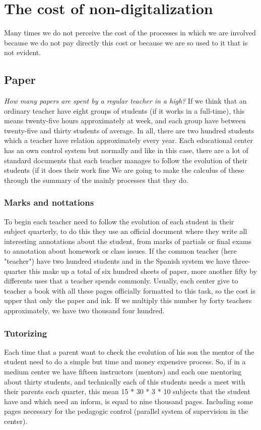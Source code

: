 \section{The cost of non-digitalization}

Many times we do not perceive the cost of the processes in which we are involved
because we do not pay directly this cost or because we are so used to it that is
not evident.

\subsection{Paper}
\textit{How many papers are spent by a regular teacher in a high?}
\intro
If we think that an ordinary teacher have eight groups of students (if it works in a
full-time), this means twenty-five hours approximately at week, and each group have
between twenty-five and thirty students of average. In all, there are two hundred students which a teacher have
relation approximately every year.
\intro
Each educational center has an own control system but normally and like in this case,
there are a lot of standard documents that each teacher manages to follow
the evolution of their students (if it does their work fine
\intro
We are going to make the calculus of these through the summary of the mainly
processes that they do.

\subsubsection{Marks and nottations}

To begin each teacher need to follow the evolution of each student in their
subject quarterly, to do this they use an official document where they write
all interesting annotations about the student, from marks of partials or final
exams to annotation about homework or class issues.
\intro
If the common teacher (here "teacher") have two hundred students and in the Spanish
system we have three-quarter this make up a total of six hundred sheets of paper,
more another fifty by differents uses that a teacher spends commonly.
Usually, each center give to teacher a book with all these pages officially
formatted to this task, so the cost is upper that only the paper and ink.
If we multiply this number by forty teachers approximately, we have
two thousand four hundred.

\subsubsection{Tutorizing}
Each time that a parent want to check the evolution of his son the mentor
of the student need to do a simple but time and money expensive process.
\intro
So, if in a medium center we have fifteen instructors (mentors) and each one mentoring about
thirty students, and technically each of this students needs a meet with their
parents each quarter, this mean 15 * 30 * 3 * 10 subjects that the student have
 and which need an inform, is equal to nine thousand pages.
Including some pages necessary for the pedagogic control (parallel system of
supervision in the center).

